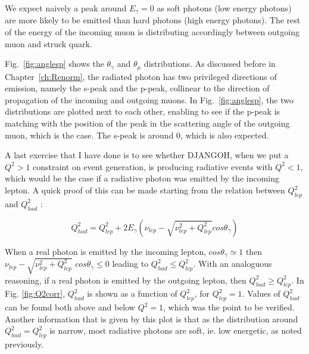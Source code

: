 We expect naively a peak around $E_{\gamma} = 0$ as soft photons (low energy photons) are more likely to be emitted than hard photons (high energy photons). The rest of the energy of the incoming muon is distributing accordingly between outgoing muon and struck quark.

Fig.~\ref{fig:anglesp} shows the $\theta_{\gamma}$ and $\theta_{\mu}$
distributions. As discussed before in Chapter~\ref{ch:Renorm}, the radiated photon has two privileged directions of emission, namely the s-peak and the p-peak, collinear to the direction of propagation of the incoming and outgoing muons. In Fig.~\ref{fig:anglesp}, the two distributions are plotted next to each other, enabling to see if the p-peak is matching with the position of the peak in the scattering angle of the outgoing muon, which is the case. The s-peak is around $0$, which is also expected.

A last exercise that I have done is to see whether DJANGOH, when we put a $Q^2>1$ constraint on event generation, is producing radiative events with $Q^2<1$, which would be the case if a radiative photon was emitted by the incoming lepton. A quick proof of this can be made starting from the relation between $Q^2_{lep}$ and $Q^2_{had}$ :

\[Q^2_{had}=Q^2_{lep}+2E_\gamma(\nu_{lep}-\sqrt{\nu_{lep}^2+Q^2_{lep}}cos\theta_\gamma)\]

When a real photon is emitted by the incoming lepton, $cos\theta_\gamma \simeq 1$ then $\nu_{lep}-\sqrt{\nu_{lep}^2+Q^2_{lep}}$
$cos\theta_\gamma \leq 0$ leading to $Q^2_{had} \leq Q^2_{lep}$. With an analoguous reasoning, if a real photon is emitted by the outgoing lepton, then $Q^2_{had} \geq Q^2_{lep}$. In Fig. \ref{fig:Q2corr}, $Q^2_{had}$ is shown as a function of $Q^2_{lep}$, for $Q^2_{lep}=1$. Values of $Q^2_{had}$ can be found both above and below $Q^2=1$, which was the point to be verified. Another information that is given by this plot is that as the distribution around $Q^2_{had} = Q^2_{lep}$ is narrow, most radiative photons are soft, ie. low energetic, as noted previously.

